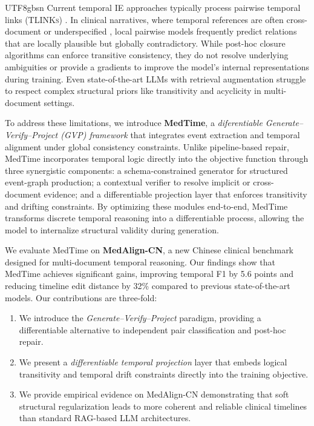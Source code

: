\documentclass[11pt]{article}
\begin{document}
\begin{CJK*}{UTF8}{gbsn}
Current temporal IE approaches typically process pairwise temporal links (\textsc{TLINKs}) \cite{han2023clinicaltimeline,lin2023temptime}. In clinical narratives, where temporal references are often cross-document or underspecified \cite{lin2023temptime,su2025transformerTIE}, local pairwise models frequently predict relations that are locally plausible but globally contradictory. While post-hoc closure algorithms \cite{ning2019matres,han2023clinicaltimeline} can enforce transitive consistency, they do not resolve underlying ambiguities or provide a gradients to improve the model's internal representations during training. Even state-of-the-art LLMs with retrieval augmentation \cite{li2024gptmed,wang2024medtemporal,fan2025consistent,eirew2025beyondpairwise,zhao2025temporaleval} struggle to respect complex structural priors like transitivity and acyclicity in multi-document settings.

To address these limitations, we introduce \textbf{MedTime}, a \emph{diferentiable Generate--Verify--Project (GVP) framework} that integrates event extraction and temporal alignment under global consistency constraints. Unlike pipeline-based repair, MedTime incorporates temporal logic directly into the objective function through three synergistic components: a schema-constrained generator for structured event-graph production; a contextual verifier to resolve implicit or cross-document evidence; and a differentiable projection layer that enforces transitivity and drifting constraints. By optimizing these modules end-to-end, MedTime transforms discrete temporal reasoning into a differentiable process, allowing the model to internalize structural validity during generation.

We evaluate MedTime on \textbf{MedAlign-CN}, a new Chinese clinical benchmark designed for multi-document temporal reasoning. Our findings show that MedTime achieves significant gains, improving temporal F1 by 5.6 points and reducing timeline edit distance by 32\% compared to previous state-of-the-art models. Our contributions are three-fold:
\begin{enumerate}[nosep]
  \item We introduce the \emph{Generate--Verify--Project} paradigm, providing a differentiable alternative to independent pair classification and post-hoc repair.
  \item We present a \emph{differentiable temporal projection} layer that embeds logical transitivity and temporal drift constraints directly into the training objective.
  \item We provide empirical evidence on MedAlign-CN demonstrating that soft structural regularization leads to more coherent and reliable clinical timelines than standard RAG-based LLM architectures.
\end{enumerate}


\end{CJK*}
\end{document}
